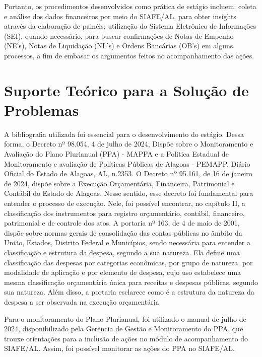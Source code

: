 \documentclass[12pt,a4paper]{article}
\begin{document}
	Portanto, os procedimentos desenvolvidos como prática de estágio incluem: coleta e análise dos dados financeiros por meio do SIAFE/AL, para obter insights através da elaboração de painéis; utilização do Sistema Eletrônico de Informações (SEI), quando necessário, para buscar confirmações de Notas de Empenho (NE’s), Notas de Liquidação (NL’s) e Ordens Bancárias (OB’s) em alguns processos, a fim de embasar os argumentos feitos no acompanhamento das ações.  

		
	\section{Suporte Teórico para a Solução de Problemas}
	\hspace*{1.5cm}A bibliografia utilizada foi essencial para o desenvolvimento do estágio. Dessa forma, o Decreto nº 98.054, 4 de julho de 2024, Dispõe sobre o Monitoramento e Avaliação do Plano Plurianual (PPA) - MAPPA e a Politica Estadual de Monitoramento e avaliação de Políticas Públicas de Alagoas - PEMAPP. Diário Oficial do Estado de Alagoas, AL, n.2353. O Decreto nº 95.161, de 16 de janeiro de 2024, dispõe sobre a Execução Orçamentária, Financeira, Patrimonial e Contábil do Estado de Alagoas. Nesse sentido, esse decreto foi fundamental para entender o processo de execução. Nele, foi possível encontrar, no capítulo II, a classificação dos instrumentos para registro orçamentário, contábil, financeiro, patrimonial e de controle dos atos. A portaria nº 163, de 4 de maio de 2001, dispõe sobre normas gerais de consolidação das contas públicas no âmbito da União, Estados, Distrito Federal e Municípios, sendo necessária para entender a classificação e estrutura da despesa, segundo a sua natureza. Ela define uma classificação das despesas por categorias econômicas, por grupo de natureza, por modalidade de aplicação e por elemento de despesa, cujo uso estabelece uma mesma classificação orçamentária única para receitas e despesas públicas, segundo sua natureza. Além disso, a portaria esclarece como é a estrutura da natureza da despesa a ser observada na execução orçamentária
	
	Para o monitoramento do Plano Plurianual, foi utilizado o manual de julho de 2024, disponibilizado pela Gerência de Gestão e Monitoramento do PPA, que trouxe orientações para a inclusão de ações no módulo de acompanhamento do SIAFE/AL. Assim, foi possível monitorar as ações do PPA no SIAFE/AL.
	
\end{document}
